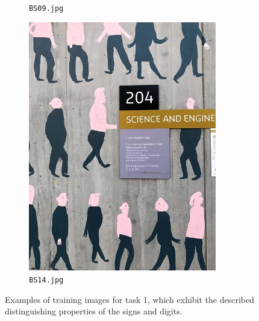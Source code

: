 \documentclass{article}
\begin{document}
\begin{figure}[h]
\begin{subfigure}[t]{0.22\textwidth}
    \caption[BS09]{
      \lstinline{BS09.jpg}
    }
    \label{fig:bs09}
  \end{subfigure}
  \begin{subfigure}[t]{0.22\textwidth}
    \centering
    \includegraphics[width=0.9\textwidth]{../train/task1/BS14}
    \caption[BS14]{
      \lstinline{BS14.jpg}
    }
    \label{fig:bs14}
  \end{subfigure}

  \caption[Task 1 - Regular Cases]{
    Examples of training images for task 1, which exhibit the described
    distinguishing properties of the signs and digits.
  }
  \label{fig:problem-1-regular}
\end{figure}
\end{document}

